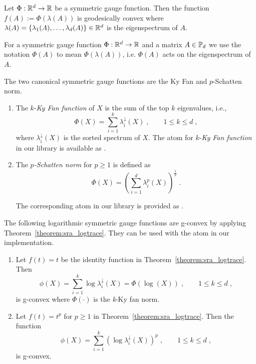 \documentclass[twoside,11pt]{article}
\begin{document}
\begin{prop}\label{prop:sgf_gvx}
 Let $\Phi: \mathbb{R}^d \to \mathbb{R}$ be a symmetric gauge function. Then the function  $f(A) := \Phi(\lambda(A))$ is geodesically convex where $\lambda(A) = \{\lambda_1(A), \ldots, \lambda_d(A)\} \in \mathbb{R}^d$ is the eigenspectrum of $A$.
\end{prop}

\begin{remark}
    For a symmetric gauge function $\Phi: \mathbb{R}^d \to \mathbb{R}$ and a matrix $A \in \mathbb{P}_d$ we use the notation $\Phi(A)$ to mean $\Phi(\lambda(A))$, i.e. $\Phi(A)$ acts on the eigenspectrum of $A$.
\end{remark}

\begin{example}
    The two canonical symmetric gauge functions are the Ky Fan and $p$-Schatten norm.
    \begin{enumerate}
        \item The $k$-\emph{Ky Fan function} of $X$ is the sum of the top $k$ eigenvalues, i.e., 
        \[
        \Phi(X) = \sum_{i=1}^k \lambda_i^\downarrow(X) \; , \qquad 1 \leq k \leq d \; ,
        \]
        where $\lambda_i^\downarrow(X)$ is the sorted spectrum of $X$. The atom for $k$-\emph{Ky Fan function} in our library is available as . 
        \item The \emph{$p$-Schatten norm} for $p \geq 1$ is defined as 
        \[
        \Phi(X) = \left(\sum_{i=1}^d \lambda^p_i(X)\right)^{\frac{1}{p}} \; .
        \]

        The corresponding atom in our library is provided as .
    \end{enumerate}
\end{example}



\begin{example}
    The following logarithmic symmetric gauge functions are g-convex by applying Theorem~\ref{theorem:sra_logtrace}. They can be used with the  atom in our implementation.
    \begin{enumerate}
        \item Let $f(t) = t$ be the identity function in Theorem~\ref{theorem:sra_logtrace}. Then 
        \[
        \phi(X) = \sum_{i=1}^k \log \lambda_i^\downarrow(X) = \Phi(\log(X)) \; , \qquad 1 \leq k \leq d \; ,
        \]
    is g-convex where $\Phi(\cdot)$ is the \textit{k}-Ky fan norm. 
    \item Let $f(t) = t^p$ for $p \geq 1$ in Theorem~\ref{theorem:sra_logtrace}. Then the function
    \[
    \phi(X) = \sum_{i=1}^k \left(\log \lambda^\downarrow_i(X)\right)^p \; , \qquad 1 \leq k \leq d \; ,
    \]
    is g-convex. 
    \end{enumerate}

\end{example}
\end{document}

